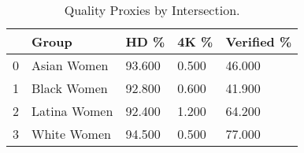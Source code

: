 \begin{table}[htbp]
\centering
\caption{Quality Proxies by Intersection.}
\label{tab:eda_quality_proxies_by_group}
\begin{tabular}{lllll}
\toprule
 & Group & HD \% & 4K \% & Verified \% \\
\midrule
0 & Asian Women & 93.600 & 0.500 & 46.000 \\
1 & Black Women & 92.800 & 0.600 & 41.900 \\
2 & Latina Women & 92.400 & 1.200 & 64.200 \\
3 & White Women & 94.500 & 0.500 & 77.000 \\
\bottomrule
\end{tabular}

\end{table}